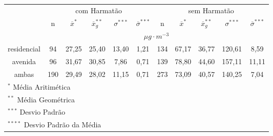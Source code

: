 \begin{tabular}{cccccc|ccccc}
  \hline
  &  \multicolumn{5}{c|}{com Harmatão} & \multicolumn{5}{c}{sem Harmatão} \\
 & n & $\overline{x}^*$ & $\overline{x}_g^{**}$ & $\sigma^{***}$ & $\overline{\sigma}^{***}$
 & n & $\overline{x}^*$ & $\overline{x}_g^{**}$ & $\sigma^{***}$ & $\overline{\sigma}^{***}$ \\
                       \hline & \multicolumn{10}{c}{$\mu g \cdot m^{-3}$} \\  \hline
residencial & 94 & 27,25 & 25,40 & 13,40 & 1,21 & 134 & 67,17 & 36,77 & 120,61 & 8,59 \\ 
  avenida   & 96 & 31,67 & 30,85 & 7,86 & 0,71 & 139 & 78,80 & 44,60 & 157,11 & 11,11 \\ 
  ambas     & 190 & 29,49 & 28,02 & 11,15 & 0,71 & 273 & 73,09 & 40,57 & 140,25 & 7,04 \\ 
   \hline
\multicolumn{11}{l}{$^{*}$ Média Aritimética} \\
\multicolumn{11}{l}{$^{**}$ Média Geométrica} \\
\multicolumn{11}{l}{$^{***}$ Desvio Padrão} \\
\multicolumn{11}{l}{$^{****}$ Desvio Padrão da Média} \\
\hline
\end{tabular}

